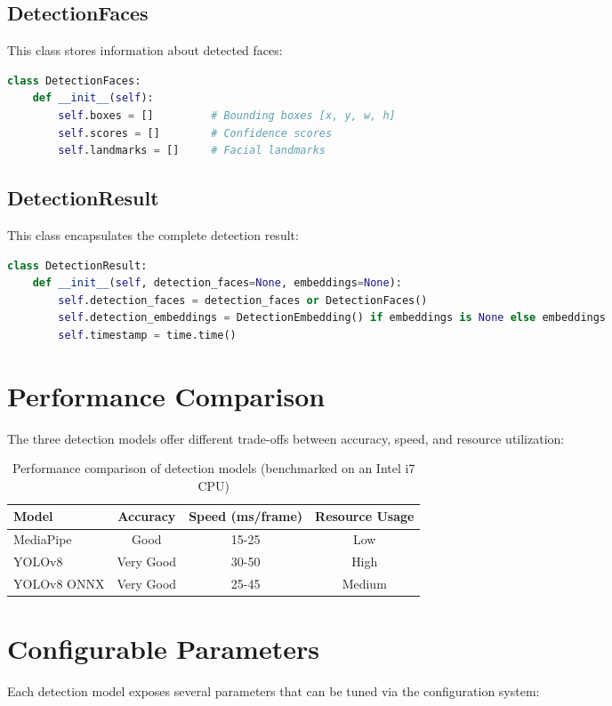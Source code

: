 \subsection{DetectionFaces}
This class stores information about detected faces:
\begin{lstlisting}[language=Python]
class DetectionFaces:
    def __init__(self):
        self.boxes = []         # Bounding boxes [x, y, w, h]
        self.scores = []        # Confidence scores
        self.landmarks = []     # Facial landmarks
\end{lstlisting}

\subsection{DetectionResult}
This class encapsulates the complete detection result:
\begin{lstlisting}[language=Python]
class DetectionResult:
    def __init__(self, detection_faces=None, embeddings=None):
        self.detection_faces = detection_faces or DetectionFaces()
        self.detection_embeddings = DetectionEmbedding() if embeddings is None else embeddings
        self.timestamp = time.time()
\end{lstlisting}

\section{Performance Comparison}
The three detection models offer different trade-offs between accuracy, speed, and resource utilization:

\begin{table}[H]
\centering
\begin{tabular}{lccc}
\toprule
\textbf{Model} & \textbf{Accuracy} & \textbf{Speed (ms/frame)} & \textbf{Resource Usage} \\
\midrule
MediaPipe & Good & 15-25 & Low \\
YOLOv8 & Very Good & 30-50 & High \\
YOLOv8 ONNX & Very Good & 25-45 & Medium \\
\bottomrule
\end{tabular}
\caption{Performance comparison of detection models (benchmarked on an Intel i7 CPU)}
\label{tab:detection_performance}
\end{table}

\section{Configurable Parameters}
Each detection model exposes several parameters that can be tuned via the configuration system:

